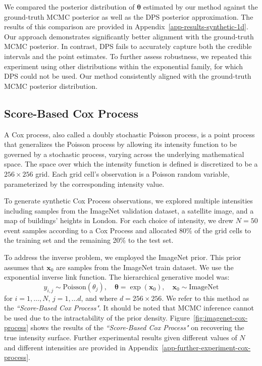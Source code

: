 We compared the posterior distribution of $\boldsymbol{\theta}$ estimated by our method against the ground-truth MCMC posterior as well as the DPS posterior approximation. 
The results of this comparison are provided in Appendix~\ref{app-results-synthetic-1d}.
Our approach demonstrates significantly better alignment with the ground-truth MCMC posterior. In contrast, DPS fails to accurately capture both the credible intervals and the point estimates.
To further assess robustness, we repeated this experiment using other distributions within the exponential family, for which DPS could not be used. Our method consistently aligned with the ground-truth MCMC posterior distribution. 


\subsection{Score-Based Cox Process}
\label{sec-experiment-cox-process}
A Cox process, also called a doubly stochastic Poisson process, is a point process that generalizes the Poisson process by allowing its intensity function to be governed by a stochastic process, varying across the underlying mathematical space. The space over which the intensity function is defined is discretized to be a $256 \times 256$ grid. Each grid cell's observation is a Poisson random variable, parameterized by the corresponding intensity value.

To generate synthetic Cox Process observations, we explored multiple intensities including samples from the ImageNet validation dataset, a satellite image, and a map of buildings' heights in London. For each choice of intensity, we drew $N = 50$ event samples according to a Cox Process and allocated 80\% of the grid cells to the training set and the remaining 20\% to the test set.

To address the inverse problem, we employed the ImageNet prior. This prior assumes that $\mathbf{x}_0$ are samples from the ImageNet train dataset. We use the exponential inverse link function. The hierarchical generative model was:
\begin{equation*}
y_{i,j} \sim \text{Poisson}(\theta_j), \quad
\boldsymbol{\theta} = \exp(\mathbf{x}_0), \quad
\mathbf{x}_0 \sim \text{ImageNet}
\end{equation*}
for $i = 1, \ldots, N$, $j = 1, \ldots d$, and where $d = 256\times 256$. We refer to this method as the \textit{``Score-Based Cox Process"}. It should be noted that MCMC inference cannot be used due to the intractability of the prior density.
Figure~\ref{fig:imagenet-cox-process} shows the results of the \textit{``Score-Based Cox Process"} on recovering the true intensity surface. Further experimental results given different values of $N$ and different intensities are provided in Appendix~\ref{app-further-experiment-cox-process}. 



